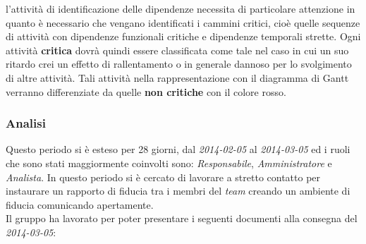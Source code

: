 l'attività di identificazione delle dipendenze necessita di particolare attenzione in quanto è necessario che vengano identificati i cammini critici, cioè quelle sequenze di attività con dipendenze funzionali critiche e dipendenze temporali strette. Ogni attività \textbf{critica} dovrà quindi essere classificata come tale nel caso in cui un suo ritardo crei un effetto di rallentamento o in generale dannoso per lo svolgimento di altre attività. Tali attività nella rappresentazione con il diagramma di Gantt verranno differenziate da quelle \textbf{non critiche} con il colore rosso.
\subsubsection{Analisi}
Questo periodo si è esteso per 28 giorni, dal \textit{2014-02-05} al \textit{2014-03-05} ed i ruoli che sono stati maggiormente coinvolti sono: \textit{Responsabile}, \textit{Amministratore} e \textit{Analista}.
In questo periodo si è cercato di lavorare a stretto contatto per instaurare un rapporto di fiducia tra i membri del \textit{team} creando un ambiente di fiducia comunicando apertamente.
\\
Il gruppo \gruppo ha lavorato per poter presentare i seguenti documenti alla consegna del \textit{2014-03-05}:\\

